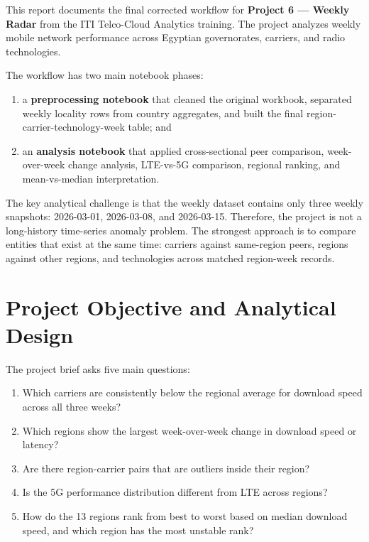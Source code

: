 \documentclass[12pt,a4paper]{article}
\begin{document}
This report documents the final corrected workflow for \textbf{Project 6 --- Weekly Radar} from the ITI Telco-Cloud Analytics training. The project analyzes weekly mobile network performance across Egyptian governorates, carriers, and radio technologies.

The workflow has two main notebook phases:

\begin{enumerate}[label=\arabic*.]
    \item a \textbf{preprocessing notebook} that cleaned the original workbook, separated weekly locality rows from country aggregates, and built the final region-carrier-technology-week table; and
    \item an \textbf{analysis notebook} that applied cross-sectional peer comparison, week-over-week change analysis, LTE-vs-5G comparison, regional ranking, and mean-vs-median interpretation.
\end{enumerate}

The key analytical challenge is that the weekly dataset contains only three weekly snapshots: 2026-03-01, 2026-03-08, and 2026-03-15. Therefore, the project is not a long-history time-series anomaly problem. The strongest approach is to compare entities that exist at the same time: carriers against same-region peers, regions against other regions, and technologies across matched region-week records.

\section{Project Objective and Analytical Design}

The project brief asks five main questions:

\begin{enumerate}[label=\textbf{Q\arabic*.}]
    \item Which carriers are consistently below the regional average for download speed across all three weeks?
    \item Which regions show the largest week-over-week change in download speed or latency?
    \item Are there region-carrier pairs that are outliers inside their region?
    \item Is the 5G performance distribution different from LTE across regions?
    \item How do the 13 regions rank from best to worst based on median download speed, and which region has the most unstable rank?
\end{enumerate}
\end{document}
